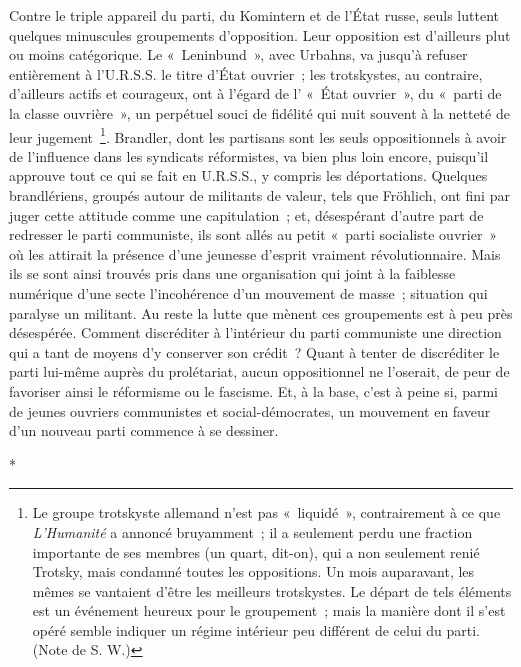 \documentclass[french,twoside]{book} %
\begin{document}
Contre le triple appareil du parti, du Komintern et de l'État russe, seuls luttent quelques minuscules groupements d'opposition. Leur opposition est d'ailleurs plut ou moins catégorique. Le « Leninbund », avec Urbahns, va jusqu'à refuser entièrement à l'U.R.S.S. le titre d'État ouvrier ; les trotskystes, au contraire, d'ailleurs actifs et courageux, ont à l'égard de l' « État ouvrier », du « parti de la classe ouvrière », un perpétuel souci de fidélité qui nuit souvent à la netteté de leur jugement \footnote{ Le groupe trotskyste allemand n'est pas « liquidé », contrairement à ce que {\itshape L'Humanité} a annoncé bruyamment ; il a seulement perdu une fraction importante de ses membres (un quart, dit-on), qui a non seulement renié Trotsky, mais condamné toutes les oppositions. Un mois auparavant, les mêmes se vantaient d'être les meilleurs trotskystes. Le départ de tels éléments est un événement heureux pour le groupement ; mais la manière dont il s'est opéré semble indiquer un régime intérieur peu différent de celui du parti. (Note de S. W.)}. Brandler, dont les partisans sont les seuls oppositionnels à avoir de l'influence dans les syndicats réformistes, va bien plus loin encore, puisqu'il approuve tout ce qui se fait en U.R.S.S., y compris les déportations. Quelques brandlériens, groupés autour de militants de valeur, tels que Fröhlich, ont fini par juger cette attitude comme une capitulation ; et, désespérant d'autre part de redresser le parti communiste, ils sont allés au petit « parti socialiste ouvrier » où les attirait la présence d'une jeunesse d'esprit vraiment révolutionnaire. Mais ils se sont ainsi trouvés pris dans une organisation qui joint à la faiblesse numérique d'une secte l'incohé­rence d'un mouvement de masse ; situation qui paralyse un militant. Au reste la lutte que mènent ces groupements est à peu près désespérée. Comment discréditer à l'intérieur du parti communiste une direction qui a tant de moyens d'y conserver son crédit ? Quant à tenter de discréditer le parti lui-mê­me auprès du prolétariat, aucun oppositionnel ne l'oserait, de peur de favoriser ainsi le réformisme ou le fascisme. Et, à la base, c'est à peine si, parmi de jeunes ouvriers communistes et social-démocrates, un mouvement en faveur d'un nouveau parti commence à se dessiner.\par
\par

\begin{center}
\noindent \centerline{*}\par
\end{center}
\end{document}
